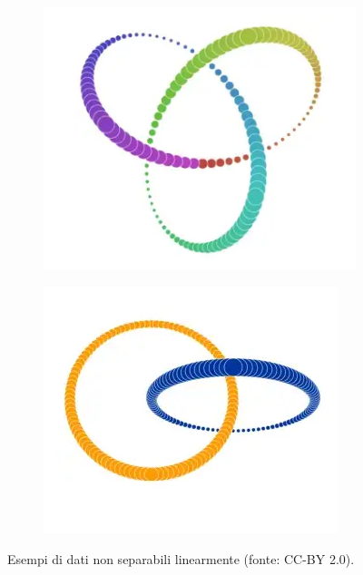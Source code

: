 \documentclass[12pt,italian]{report}
\begin{document}
	\begin{figure}
		\centering
		\begin{subfigure}[b]{0.49\textwidth}
			\centering
			\includegraphics[width=0.9\linewidth]{immagini/t-SNEImage}
			\caption{}
			\label{fig:t-sneimage}
		\end{subfigure}
		\begin{subfigure}[b]{0.49\textwidth}
			\centering
			\includegraphics[width=1\linewidth]{immagini/t-SNEImage2}
			\caption{}
			\label{fig:t-sneimage2}
		\end{subfigure}
		\caption{Esempi di dati non separabili linearmente (fonte: \cite{tnseDatiNonSeparabili} CC-BY 2.0).}
		\label{fig:t-sneImageAll}
	\end{figure}
\end{document}
